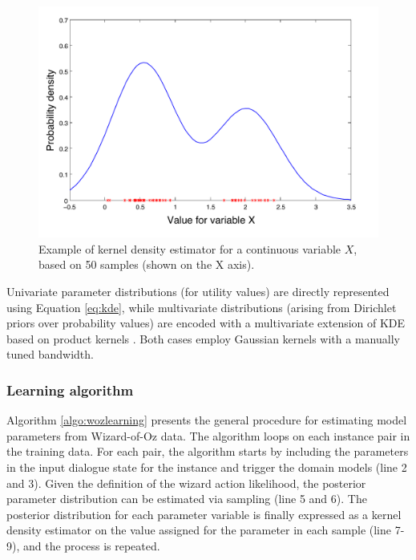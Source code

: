 \begin{figure}[h]
\centering
\includegraphics[scale=0.4]{imgs/kde.pdf} 
\caption{Example of kernel density estimator for a continuous variable $X$, based on 50 samples (shown on the X axis).}
\label{fig:kde}
\end{figure}

Univariate parameter distributions (for utility values) are directly represented using Equation \eqref{eq:kde}, while multivariate distributions (arising from Dirichlet priors over probability values) are encoded with a multivariate extension of KDE based on product kernels \citep{Silverman1986}.  Both cases employ Gaussian kernels with a manually tuned bandwidth. 


\subsubsection*{Learning algorithm}

Algorithm \ref{algo:wozlearning} presents the general procedure for estimating model parameters from Wizard-of-Oz data.  The algorithm loops on each instance pair in the training data.  For each pair, the algorithm starts by including the parameters in the input dialogue state for the 
instance and trigger the domain models (line 2 and 3). Given the definition of the wizard action likelihood, the posterior parameter distribution can be estimated via sampling (line 5 and 6).  The posterior distribution for each parameter variable is finally expressed as a kernel density estimator on the value assigned for the parameter in each sample (line 7-9), and the process is repeated. 

